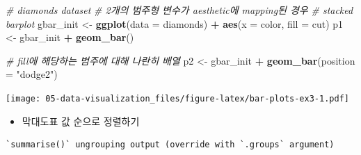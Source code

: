 \documentclass[
  11pt,
]{krantz}
\newenvironment{Shaded}{\begin{snugshade}}{\end{snugshade}}
\newcommand{\CommentTok}[1]{\textcolor[rgb]{0.37,0.37,0.37}{\textit{#1}}}
\newcommand{\DataTypeTok}[1]{\textcolor[rgb]{0.27,0.27,0.27}{#1}}
\newcommand{\DecValTok}[1]{\textcolor[rgb]{0.06,0.06,0.06}{#1}}
\newcommand{\KeywordTok}[1]{\textcolor[rgb]{0.27,0.27,0.27}{\textbf{#1}}}
\newcommand{\NormalTok}[1]{#1}
\newcommand{\OperatorTok}[1]{\textcolor[rgb]{0.43,0.43,0.43}{\textbf{#1}}}
\newcommand{\OtherTok}[1]{\textcolor[rgb]{0.37,0.37,0.37}{#1}}
\newcommand{\StringTok}[1]{\textcolor[rgb]{0.5,0.5,0.5}{#1}}
\providecommand{\tightlist}{%
  \setlength{\itemsep}{0pt}\setlength{\parskip}{0pt}}
\begin{document}
\begin{Shaded}
\begin{Highlighting}[]
\CommentTok{# diamonds dataset}
\CommentTok{# 2개의 범주형 변수가 aesthetic에 mapping된 경우}
\CommentTok{# stacked barplot}
\NormalTok{gbar_init <-}\StringTok{ }\KeywordTok{ggplot}\NormalTok{(}\DataTypeTok{data =}\NormalTok{ diamonds) }\OperatorTok{+}\StringTok{ }
\StringTok{  }\KeywordTok{aes}\NormalTok{(}\DataTypeTok{x =}\NormalTok{ color, }\DataTypeTok{fill =}\NormalTok{ cut)}
\NormalTok{p1 <-}\StringTok{ }\NormalTok{gbar_init }\OperatorTok{+}\StringTok{ }
\StringTok{  }\KeywordTok{geom_bar}\NormalTok{()}
  
\CommentTok{# fill에 해당하는 범주에 대해 나란히 배열}
\NormalTok{p2 <-}\StringTok{ }\NormalTok{gbar_init }\OperatorTok{+}\StringTok{ }
\StringTok{  }\KeywordTok{geom_bar}\NormalTok{(}\DataTypeTok{position =} \StringTok{"dodge2"}\NormalTok{)}
\end{Highlighting}
\end{Shaded}

\normalsize

\footnotesize

\texttt{[image: 05-data-visualization\_files/figure-latex/bar-plots-ex3-1.pdf]}

\normalsize

\begin{itemize}
\tightlist
\item
  막대도표 값 순으로 정렬하기
\end{itemize}

\footnotesize

\begin{Shaded}
\end{Shaded}

\begin{verbatim}
`summarise()` ungrouping output (override with `.groups` argument)
\end{verbatim}
\end{document}
